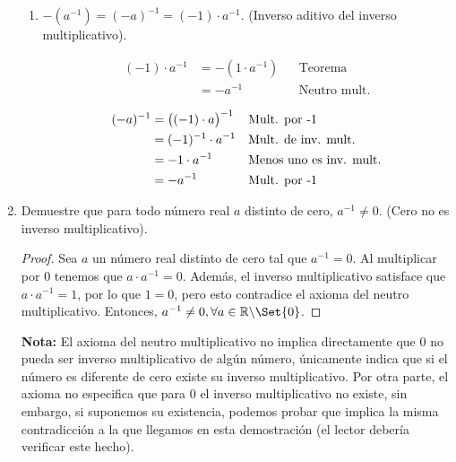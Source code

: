 \documentclass[11pt]{article}
\newcommand{\R}{\mathbb{R}}
\let\set\Set
\begin{document}
\begin{enumerate}[label=\alph*)]
\begin{enumerate}[label=\roman*)]
        \item $-(a^{-1})=(-a)^{-1}=(-1)\cdot a^{-1}$. (Inverso aditivo del inverso multiplicativo).
        \begin{center}\vspace{-2em}
            \begin{minipage}[t]{.5\linewidth}
                \begin{align*}
                    (-1)\cdot a^{-1} &= -(1\cdot a^{-1}) && \text{Teorema}\\
                    &= -a^{-1} && \text{Neutro mult.}
                \end{align*}
            \end{minipage}%
            \begin{minipage}[t]{.5\linewidth}
                \begin{align*}
                (-a)^{-1} &= \bigl((-1)\cdot a\bigr)^{-1} && \text{Mult. por -1}\\
                &= (-1)^{-1} \cdot a^{-1} && \text{Mult. de inv. mult.}\\
                &= -1 \cdot a^{-1} && \text{Menos uno es inv. mult.}\\
                &= -a^{-1} && \text{Mult. por -1} \qedhere
                \end{align*}
            \end{minipage}
            \end{center}

    \end{enumerate}%

    \item Demuestre que para todo número real $a$ distinto de cero, $a^{-1}\neq 0$. (Cero no es inverso multiplicativo).
    
    \vspace{-1em}\begin{proof} 
        Sea $a$ un número real distinto de cero tal que $a^{-1}=0$. Al multiplicar por $0$ tenemos que $a\cdot a^{-1}=0$. Además, el inverso multiplicativo satisface que $a\cdot a^{-1}=1$, por lo que $1=0$, pero esto contradice el axioma del neutro multiplicativo. Entonces, $a^{-1}\neq 0, \forall a\in \R\backslash \set{0}$.    
    \end{proof} \vspace{-1em}

    \textbf{Nota:} El axioma del neutro multiplicativo no implica directamente que $0$ no pueda ser inverso multiplicativo de algún número, únicamente indica que si el número es diferente de cero existe su inverso multiplicativo. Por otra parte, el axioma no especifica que para 0 el inverso multiplicativo no existe, sin embargo, si suponemos su existencia, podemos probar que implica la misma contradicción a la que llegamos en esta demostración (el lector debería verificar este hecho).


\end{enumerate}
\end{document}
